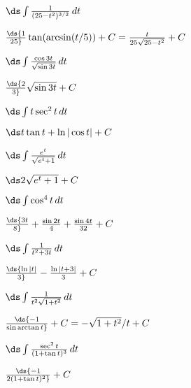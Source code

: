 \begin{exercises}
\begin{exercise} $\ds\int {1\over (25-t^2)^{3/2}}\,dt$
\begin{answer} $\ds{1\over25}\tan(\arcsin(t/5))+C={t\over25\sqrt{25-t^2}}+C$
\end{answer}\end{exercise}

\begin{exercise} $\ds\int {\cos 3t\over\sqrt{\sin3t}}\,dt$
\begin{answer} $\ds{2\over3}\sqrt{\sin 3t}+C$
\end{answer}\end{exercise}

\begin{exercise} $\ds\int t\sec^2 t\,dt$
\begin{answer} $\ds t\tan t+\ln|\cos t|+C$
\end{answer}\end{exercise}

\begin{exercise} $\ds\int {e^t\over \sqrt{e^t+1}}\,dt$
\begin{answer} $\ds 2\sqrt{e^t+1}+C$
\end{answer}\end{exercise}

\begin{exercise} $\ds\int \cos^4 t\,dt$
\begin{answer} $\ds{3t\over 8}+{\sin 2t\over4}+ {\sin 4t\over 32}+C$
\end{answer}\end{exercise}

\begin{exercise} $\ds\int {1\over t^2+3t}\,dt$
\begin{answer} $\ds{\ln |t|\over 3} - {\ln |t+3|\over 3}+C$
\end{answer}\end{exercise}

\begin{exercise} $\ds\int {1\over t^2\sqrt{1+t^2}}\,dt$
\begin{answer} $\ds{-1\over \sin\arctan t}+C=-\sqrt{1+t^2}/t+C$
\end{answer}\end{exercise}

\begin{exercise} $\ds\int {\sec^2t\over (1+\tan t)^3}\,dt$
\begin{answer} $\ds{-1\over 2(1+\tan t)^2}+C$
\end{answer}\end{exercise}


\end{exercises}
